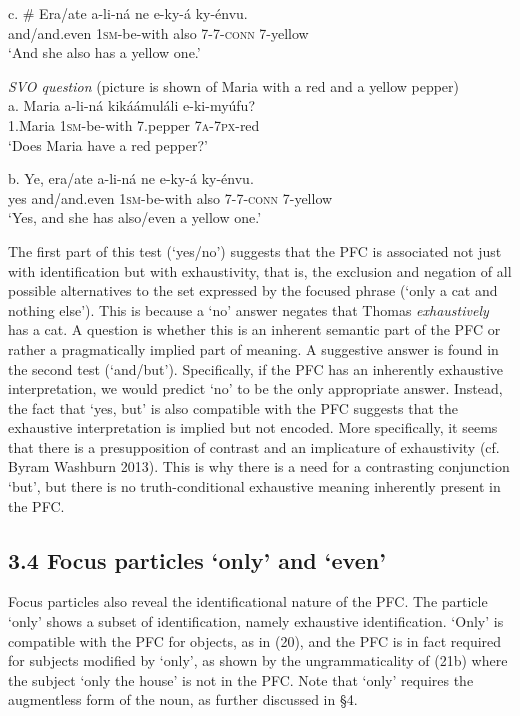 \documentclass[output=paper]{langsci/langscibook}
\begin{document}
\ea
\gll   c.  \# Era/ate  a-li-ná  ne  e-ky-á    ky-énvu.\\
         and/and.even  \textsc{1sm}{}-be-with  also  \textsc{7}{}-\textsc{7}{}-\textsc{conn}  7-yellow\\
\glt     ‘And she also has a yellow one.’
\z

\ea
{\textit{SVO question}}
       (picture is shown of Maria with a red and a yellow pepper)\\
\gll   a.  Maria    a-li-ná  kikáámuláli  e-ki-myúfu?\\
         1.Maria  \textsc{1sm}{}-be-with  7.pepper  \textsc{7a}{}-\textsc{7px}{}-red\\
\glt     ‘Does Maria have a red pepper?’
\z

\ea
\gll   b.  Ye,  era/ate  a-li-ná  ne  e-ky-á    ky-énvu.\\
         yes  and/and.even  \textsc{1sm}{}-be-with  also  \textsc{7}{}-\textsc{7}{}-\textsc{conn}  7-yellow\\
\glt     ‘Yes, and she has also/even a yellow one.’
\z

The first part of this test (‘yes/no’) suggests that the PFC is associated not just with identification but with exhaustivity, that is, the exclusion and negation of all possible alternatives to the set expressed by the focused phrase (‘only a cat and nothing else’). This is because a ‘no’ answer negates that Thomas \textit{exhaustively} has a cat. A question is whether this is an inherent semantic part of the PFC or rather a pragmatically implied part of meaning. A suggestive answer is found in the second test (‘and/but’). Specifically, if the PFC has an inherently exhaustive interpretation, we would predict ‘no’ to be the only appropriate answer. Instead, the fact that ‘yes, but’ is also compatible with the PFC suggests that the exhaustive interpretation is implied but not encoded. More specifically, it seems that there is a presupposition of contrast and an implicature of exhaustivity (cf. Byram Washburn 2013). This is why there is a need for a contrasting conjunction ‘but’, but there is no truth-conditional exhaustive meaning inherently present in the PFC. 

\subsection{3.4 Focus particles ‘only’ and ‘even’}

Focus particles also reveal the identificational nature of the PFC. The particle ‘only’ shows a subset of identification, namely exhaustive identification. ‘Only’ is compatible with the PFC for objects, as in (20), and the PFC is in fact required for subjects modified by ‘only’, as shown by the ungrammaticality of (21b) where the subject ‘only the house’ is not in the PFC. Note that ‘only’ requires the augmentless form of the noun, as further discussed in §4.
\end{document}
